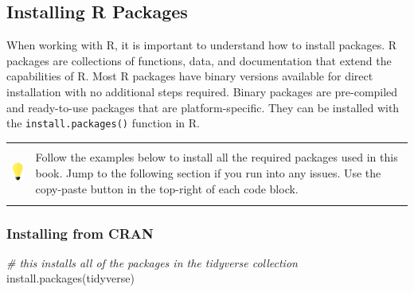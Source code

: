 \documentclass[
]{book}
\newenvironment{Shaded}{\begin{snugshade}}{\end{snugshade}}
\newcommand{\CommentTok}[1]{\textcolor[rgb]{0.56,0.35,0.01}{\textit{#1}}}
\newcommand{\FunctionTok}[1]{\textcolor[rgb]{0.00,0.00,0.00}{#1}}
\newcommand{\NormalTok}[1]{#1}
\newcommand{\StringTok}[1]{\textcolor[rgb]{0.31,0.60,0.02}{#1}}
\begin{document}
\hypertarget{installing-r-packages}{%
\subsection{Installing R Packages}\label{installing-r-packages}}

When working with R, it is important to understand how to install packages. R packages are collections of functions, data, and documentation that extend the capabilities of R. Most R packages have binary versions available for direct installation with no additional steps required. Binary packages are pre-compiled and ready-to-use packages that are platform-specific. They can be installed with the \texttt{install.packages()} function in R.

\hfill\break

\begin{longtable}[]{@{}
  >{\raggedright\arraybackslash}p{}
  >{\raggedright\arraybackslash}p{}@{}}
\toprule\noalign{}
\endhead
\bottomrule\noalign{}
\endlastfoot
\includegraphics[width=\textwidth,height=0.70833in]{images/01.png} & Follow the examples below to install all the required packages used in this book. Jump to the following section if you run into any issues. Use the copy-paste button in the top-right of each code block. \\
\end{longtable}

\hfill\break

\hypertarget{installing-from-cran}{%
\subsubsection*{Installing from CRAN}\label{installing-from-cran}}

\begin{Shaded}
\begin{Highlighting}[]
\CommentTok{\# this installs all of the packages in the tidyverse collection}
\FunctionTok{install.packages}\NormalTok{(}\StringTok{\textquotesingle{}tidyverse\textquotesingle{}}\NormalTok{)}
\end{Highlighting}
\end{Shaded}
\end{document}

